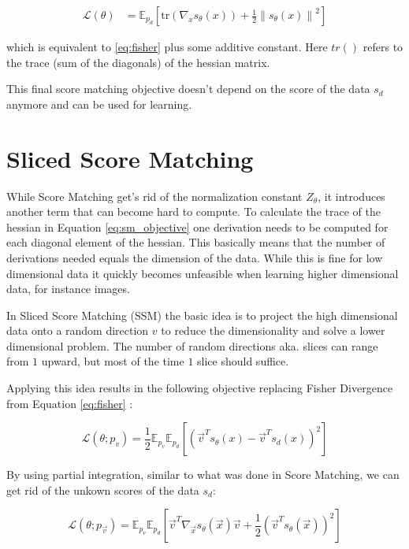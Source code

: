 \begin{align}
    \label{eq:sm_objective}
    \mathcal{L}(\theta) & = \mathbb{E}_{p_d} \left[\text{tr} \left( \nabla_x s_\theta(x) \right) + \frac{1}{2} \left\| s_\theta(x) \right\|^2 \right]
\end{align}

which is equivalent to \ref{eq:fisher} plus some additive constant. Here $tr()$ refers to the
trace (sum of the diagonals) of the hessian matrix.
 
This final score matching objective doesn't depend on the score of the data $s_d$ anymore and can be used for learning.

\section{Sliced Score Matching}
\label{sec:ssm}

While Score Matching get's rid of the normalization constant $Z_\theta$, it introduces another term that can become hard
to compute. To calculate the trace of the hessian in Equation \ref{eq:sm_objective} one derivation needs to be computed for each diagonal element of the hessian.
This basically means that the number of derivations needed equals the dimension of the data. 
While this is fine for low dimensional data it quickly becomes unfeasible when
learning higher dimensional data, for instance images.  

In Sliced Score Matching (SSM) \cite{ssm} the basic idea is to project the high dimensional data onto a random direction $v$ to reduce 
the dimensionality and solve a lower dimensional problem. The number of random directions aka. slices can range from $1$ upward, but 
most of the time $1$ slice should suffice. 

Applying this idea results in the following objective replacing Fisher Divergence from Equation \ref{eq:fisher} \cite{ssm}: 

\begin{equation}
    \label{eq:ssm}
    \mathcal{L}(\theta; p_v) = \frac{1}{2} \mathbb{E}_{p_v} \mathbb{E}_{p_d} \left[ \left( \vec{v}^T s_\theta(x) - \vec{v}^T s_d(x) \right)^2 \right]
\end{equation}

By using partial integration, similar to what was done in Score Matching, we can get rid of the unkown scores of the data $s_d$:

\begin{equation}
    \label{eq:ssm_final}
    \mathcal{L}(\theta; p_\vec{v}) = \mathbb{E}_{p_v} \mathbb{E}_{p_d} \left[ \vec{v}^T \nabla_\vec{x} s_\theta(\vec{x}) \vec{v} + \frac{1}{2} \left( \vec{v}^T s_\theta(\vec{x}) \right)^2 \right]
\end{equation}

